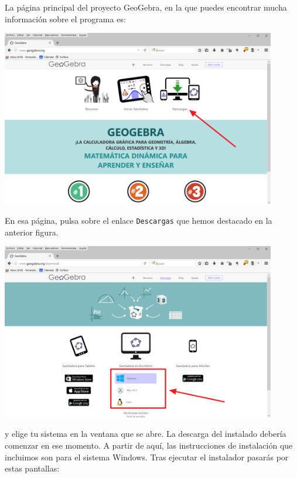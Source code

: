 \documentclass[10pt,a4paper]{article}
\newcounter {cont01}
\begin{document}
La página principal del proyecto GeoGebra, en la que puedes encontrar mucha información sobre el
programa es:
\begin{center}
\end{center}
    \begin{center}
    \includegraphics[width=12cm]{../fig/Tut00-GeoGebraDescarga01-201605.png}
    \end{center}
En esa página, pulsa sobre el enlace {\tt Descargas} que hemos destacado en la anterior
figura.
    \begin{center}
    \includegraphics[width=12cm]{../fig/Tut00-GeoGebraDescarga02-201605.png}
    \end{center}
y elige tu sistema en la ventana que se abre. La descarga del instalado debería comenzar en ese
momento. A partir de aquí, las instrucciones de instalación que incluimos son para el sistema
Windows. Tras ejecutar el instalador pasarás por estas pantallas:
\end{document}

